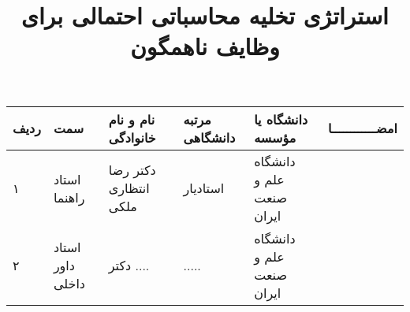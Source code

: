 \subject{مهندسی کامپیوتر}
\title{استراتژی تخلیه محاسباتی احتمالی برای وظایف ناهمگون}


\firstPage
\besmPage
\davaranPage

\begin{center}
\begin{tabular}{| p{8mm} | p{18mm} | p{} |p{14mm}|p{}|c|}
\hline
ردیف	& سمت & نام و نام خانوادگی & مرتبه \newline دانشگاهی &	دانشگاه یا مؤسسه & امضــــــــــــا\\
\hline
۱  & استاد راهنما & دکتر \newline رضا انتظاری ملکی 
& استادیار & دانشگاه \newline علم و صنعت ایران &  \\
\hline
۲ & استاد داور \newline داخلی	 & دکتر \newline ....  & ..... & 
دانشگاه  \newline علم ‌و صنعت ایران & \\
\hline

\end{tabular}
\end{center}

